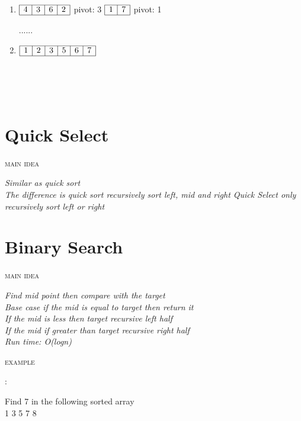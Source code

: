 \documentclass[12pt, letterpaper]{article}
\newcommand{\idea}[1]{
\noindent
\begin{minipage}[t]{0.15\textwidth}
	\textsc{main idea}
\end{minipage}
\hspace{-0.8cm}\vline\hspace{0.05cm}
\begin{minipage}[t]{0.88\textwidth}
	\textit{#1}
\end{minipage}\vspace{0.25cm}}
\newcommand{\example}[1]{
\noindent
\begin{minipage}[t]{0.02\textwidth}
	\textsc{example}
\end{minipage}
\hspace{1.6cm}:\hspace{0.05cm}
\begin{minipage}[t]{0.88\textwidth}
	\textnormal{#1}
\end{minipage}\vspace{0.25cm}}
\begin{document}
\begin{minipage}{0.8\textwidth}
\begin{enumerate}
		\item
		$\begin{array}{|l|c|c|r|}
			\hline
			4 & 3 & 6 & 2\\
			\hline
		\end{array}$
		pivot: 3
		$\begin{array}{|l|r|}
			\hline
			1 & 7\\
			\hline
		\end{array}$
		pivot: 1
		
		......
		
		\item
		$\begin{array}{|l|c|c|c|c|r|}
			\hline
			1 & 2 & 3 & 5 & 6 & 7 \\
			\hline
		\end{array}$
	\end{enumerate}
\end{minipage}
\\\\\\

\section{Quick Select}
\idea{Similar as quick sort\\
	  The difference is quick sort recursively sort left, mid and right
	  Quick Select only recursively sort left or right}
	  
\newpage
	  
\section{Binary Search}
\idea{Find mid point then compare with the target\\
      Base case if the mid is equal to target then return it\\
	  If the mid is less then target recursive left half\\
	  If the mid if greater than target recursive right half\\
	  Run time: O(logn)}
\example{Find 7 in the following sorted array\\1 3 5 7 8}
\end{document}
